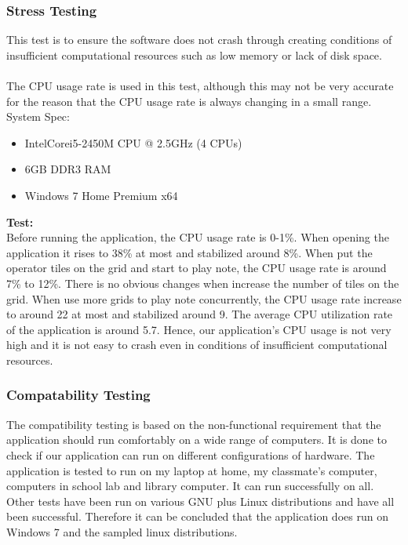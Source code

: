 \documentclass[10pt,a4paper]{article}
\begin{document}
\subsubsection{Stress Testing}
This test is to ensure the software does not crash through creating conditions of insufficient computational resources such as low memory or lack of disk space.\\
\\
The CPU usage rate is used in this test, although this may not be very accurate for the reason that the CPU usage rate is always changing in a small range.\\
\pagebreak
System Spec:
\begin{itemize}
\item Intel\textregistered Core\texttrademark i5-2450M CPU @ 2.5GHz (4 CPUs)
\item 6GB DDR3 RAM
\item Windows 7 Home Premium x64
\end{itemize}
\textbf{Test:} \\
Before running the application, the CPU usage rate is 0-1\%. When opening the application it rises to 38\% at most and stabilized around 8\%. When put the operator tiles on the grid and start to play note, the CPU usage rate is around 7\% to 12\%. There is no obvious changes when increase the number of tiles on the grid. When use more grids to play note concurrently, the CPU usage rate increase to around 22 at most and stabilized around 9. The average CPU utilization rate of the application is around 5.7. Hence, our application’s CPU usage is not very high and it is not easy to crash even in conditions of insufficient computational resources. 

\subsubsection{Compatability Testing}
The compatibility testing is based on the non-functional requirement that the application should run comfortably on a wide range of computers. It is done to check if our application can run on different configurations of hardware. The application is tested to run on my laptop at home, my classmate’s computer, computers in school lab and library computer. It can run successfully on all. Other tests have been run on various GNU plus Linux distributions and have all been successful. Therefore it can be concluded that the application does run on Windows 7 and the sampled linux distributions.\\
\end{document}
